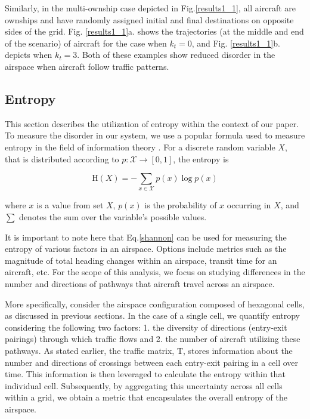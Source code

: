 \documentclass[conference, letter]{IEEEtran}
\begin{document}
Similarly, in the multi-ownship case depicted in Fig.\ref{results1_1}, all aircraft are ownships and have randomly assigned initial and final destinations on opposite sides of the grid. Fig. \ref{results1_1}a. shows the trajectories (at the  middle and end of the scenario) of aircraft for the case when $k_t = 0$, and Fig. \ref{results1_1}b. depicts when $k_t = 3$. Both of these examples show reduced disorder in the airspace when aircraft follow traffic patterns. 


\subsection{Entropy}\label{entropy}
This section describes the utilization of entropy within the context of our paper. To measure the disorder in our system, we use a popular formula used to measure entropy in the field of information theory \cite{b10}. For a discrete random variable $\textit{X}$, that is distributed according to  ${\displaystyle p\colon {\mathcal {X}}\to [0,1]}$, 
the entropy is

\begin{equation}
    \label{shannon}
    {\displaystyle \mathrm {H} (X)=-\sum _{x\in {\mathcal {X}}}p(x)\log p(x)}
\end{equation}

where $x$ is a value from set $\textit{X}$, $p(x)$ is the probability of $x$ occurring in $\textit{X}$, and $\sum$ denotes the sum over the variable's possible values. 

It is important to note here that Eq.\ref{shannon} can be used for measuring the entropy of various factors in an airspace. Options include metrics such as the magnitude of total heading changes within an airspace, transit time for an aircraft, etc. For the scope of this analysis, we focus on studying differences in the number and directions of pathways that aircraft travel across an airspace.

More specifically, consider the airspace configuration composed of hexagonal cells, as discussed in previous sections. In the case of a single cell, we quantify entropy considering the following two factors: 1. the diversity of directions (entry-exit pairings) through which traffic flows and 2. the number of aircraft utilizing these pathways. As stated earlier, the traffic matrix, T, stores information about the number and directions of crossings between each entry-exit pairing in a cell over time. This information is then leveraged to calculate the entropy within that individual cell. Subsequently, by aggregating this uncertainty across all cells within a grid, we obtain a metric that encapsulates the overall entropy of the airspace.
\end{document}
